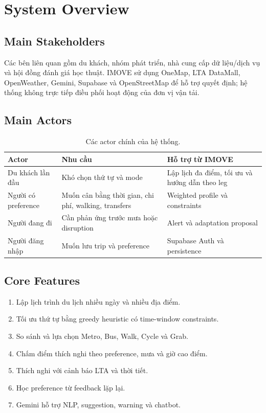 \chapter{System Overview}

\section{Main Stakeholders}

Các bên liên quan gồm du khách, nhóm phát triển, nhà cung cấp dữ liệu/dịch vụ và hội đồng đánh giá học thuật. IMOVE sử dụng OneMap, LTA DataMall, OpenWeather, Gemini, Supabase và OpenStreetMap để hỗ trợ quyết định; hệ thống không trực tiếp điều phối hoạt động của đơn vị vận tải.

\section{Main Actors}

\begin{table}[H]
\centering
\begin{tabularx}{\textwidth}{p{3.5cm}X X}
\toprule
\textbf{Actor} & \textbf{Nhu cầu} & \textbf{Hỗ trợ từ IMOVE} \\
\midrule
Du khách lần đầu & Khó chọn thứ tự và mode & Lập lịch đa điểm, tối ưu và hướng dẫn theo leg \\
Người có preference & Muốn cân bằng thời gian, chi phí, walking, transfers & Weighted profile và constraints \\
Người đang đi & Cần phản ứng trước mưa hoặc disruption & Alert và adaptation proposal \\
Người đăng nhập & Muốn lưu trip và preference & Supabase Auth và persistence \\
\bottomrule
\end{tabularx}
\caption{Các actor chính của hệ thống.}
\end{table}

\section{Core Features}

\begin{enumerate}
  \item Lập lịch trình du lịch nhiều ngày và nhiều địa điểm.
  \item Tối ưu thứ tự bằng greedy heuristic có time-window constraints.
  \item So sánh và lựa chọn Metro, Bus, Walk, Cycle và Grab.
  \item Chấm điểm thích nghi theo preference, mưa và giờ cao điểm.
  \item Thích nghi với cảnh báo LTA và thời tiết.
  \item Học preference từ feedback lặp lại.
  \item Gemini hỗ trợ NLP, suggestion, warning và chatbot.
\end{enumerate}

